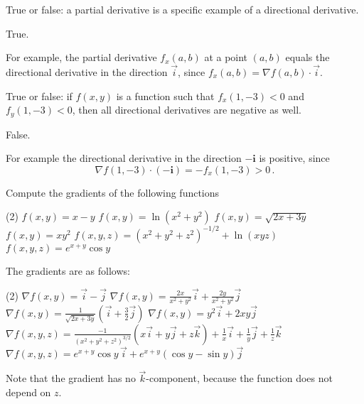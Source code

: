 \begin{question}
True or false: a partial derivative is a specific example of a directional derivative.
\end{question}

\begin{solution}
True.

For example, the partial derivative $f_x(a,b)$ at a point $(a,b)$ equals the directional derivative in the direction $\vec i$, since $f_x(a,b) = \nabla f(a,b) \cdot \vec i$.
\end{solution}

\begin{question}
True or false: if $f(x,y)$ is a function such that $f_x(1,-3) < 0$ and $f_y(1,-3) < 0$, then all directional derivatives are negative as well.
\end{question}

\begin{solution}
False.

For example the directional derivative in the direction $-\mathbf i$ is positive, since 
\[ \nabla f(1,-3) \cdot (-\mathbf i) = -f_x(1,-3) > 0\,.\]
\end{solution}

\begin{question}
Compute the gradients of the following functions
\begin{tasks}(2)
\task
$f(x,y) = x - y$
\task
$f(x,y) = \ln \left(x^2 + y^2\right)$
\task
$f(x,y) = \sqrt{2x + 3y}$
\task
$f(x,y) = xy^2$
\task
$f(x,y,z) = \left(x^2 + y^2 + z^2\right)^{-1/2} + \ln(xyz)$
\task
$f(x,y,z) = e^{x+y}\cos y$
\end{tasks}
\end{question}

\begin{solution}
The gradients are as follows:
\begin{tasks}(2)
\task
$\nabla f(x,y) = \vec i - \vec j$
\task
$\nabla f(x,y) = \frac{2x}{x^2 + y^2} \vec i + \frac{2y}{x^2 + y^2} \vec j$
\task
$\nabla f(x,y) = \frac{1}{\sqrt{2x+3y}} \left(\vec i + \frac 32 \vec j\right)$
\task
$\nabla f(x,y) = y^2 \vec i + 2xy \vec j$
\task*
$\nabla f(x,y,z) = \frac{-1}{\left(x^2+y^2+z^2\right)^{3/2}} \left( x\vec i + y\vec j + z\vec k\right) + \frac{1}{x} \vec i + \frac{1}{y} \vec j + \frac{1}{z} \vec k$
\task*
$\nabla f(x,y,z) = e^{x+y}\cos y \,\vec i + e^{x+y}\left(\cos y - \sin y\right) \vec j$

Note that the gradient has no $\vec k$-component, because the function does not depend on $z$.
\end{tasks}
\end{solution}

